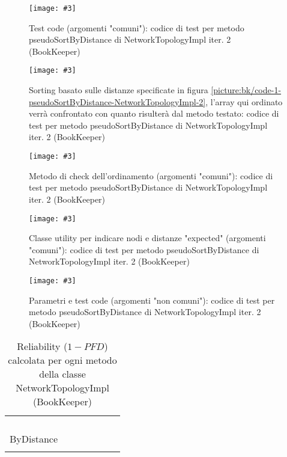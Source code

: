 \documentclass[10pt, a4paper]{article}
\newcommand{\Intmaketable}[4]{
	\begin{longtable}{#3}
	#4
	\caption{#2}
	\label{#1}
	\end{longtable}
}
\newcommand{\Intreltable}[3]{
	\Intmaketable{#1}{#2}{|l|l|l|l|l|l|l|}{
	\hline
	\thead{Metodo} & \thead{\# test totali} & \thead{\# test pass.} & \thead{\# test fail.} & \thead{Rif. num. tab. prof. op.} &
	\thead{Distribuzione} & \thead{Reliability}\\
	\hline
	\hline
	#3
	\hline}
}
\newcommand{\Intrelcaption}[2]{Reliability ($1-PFD$) calcolata per ogni metodo della classe #1 (#2)}
\newcommand{\gettablelabel}[5]{table:#1:#2:#3:iter#4:proj#5}
\newcommand{\getreltablelabel}[2]{\gettablelabel{#1}{}{}{}{#2}}
\newcommand{\reltable}[3] {
	\Intreltable{\getreltablelabel{#1}{#2}}
		{\Intrelcaption{#1}{#2}}
		{#3}
}
\newcommand{\unifdist}[1]{Uniforme: $#1$}
\newcommand{\getpicturelabel}[1]{picture:#1}
\newcommand{\makepicture}[4]{
	\begin{figure}[H]
	\centering
	\texttt{[image: \#3]}
	\caption{#4}
	\label{\getpicturelabel{#3}}
	\end{figure}
}
\newcommand{\finishcodecaption}[4]{codice di test per metodo #1 di #2 iter. #3 (#4)}
\newcommand{\tcell}{\makecell[tl]}
\newcommand{\newtrow}{\\ \hline}
\def\bookkeeper{BookKeeper}
\begin{document}
	\makepicture{17cm}{7.5cm}{bk/code-2-pseudoSortByDistance-NetworkTopologyImpl-2}
				{Test code (argomenti "comuni"): 
				\finishcodecaption{pseudoSortByDistance}{NetworkTopologyImpl}{2}{\bookkeeper}}
				
	\makepicture{17cm}{5cm}{bk/code-6-pseudoSortByDistance-NetworkTopologyImpl-2}
				{Sorting basato sulle distanze specificate in figura 
				\ref{\getpicturelabel{bk/code-1-pseudoSortByDistance-NetworkTopologyImpl-2}}, 
				l'array qui ordinato verrà confrontato con quanto risulterà dal metodo testato: 
				\finishcodecaption{pseudoSortByDistance}{NetworkTopologyImpl}{2}{\bookkeeper}}
				
	\makepicture{17cm}{16cm}{bk/code-3-pseudoSortByDistance-NetworkTopologyImpl-2}
				{Metodo di check dell'ordinamento (argomenti "comuni"): 
				\finishcodecaption{pseudoSortByDistance}{NetworkTopologyImpl}{2}{\bookkeeper}}
	
	\makepicture{10cm}{7cm}{bk/code-4-pseudoSortByDistance-NetworkTopologyImpl-2}
				{Classe utility per indicare nodi e distanze "expected" (argomenti "comuni"): 
				\finishcodecaption{pseudoSortByDistance}{NetworkTopologyImpl}{2}{\bookkeeper}}
				
	\makepicture{17cm}{12cm}{bk/code-5-pseudoSortByDistance-NetworkTopologyImpl-2}
				{Parametri e test code (argomenti "non comuni"): 
				\finishcodecaption{pseudoSortByDistance}{NetworkTopologyImpl}{2}{\bookkeeper}}
			
	\newpage
	\reltable{NetworkTopologyImpl}{\bookkeeper}{
			\tcell{add} &
			\tcell{$14$} &
			\tcell{$14$} &
			\tcell{$0$} &
			\tcell{
					tabella $\ref{\gettablelabel{testc}{add}{NetworkTopologyImpl}{1}{\bookkeeper}}$,
					tabella $\ref{\gettablelabel{testc}{add}{NetworkTopologyImpl}{2}{\bookkeeper}}$} &
			\tcell{\unifdist{0.07}} &
			\tcell{$1$}
		\newtrow	
			\tcell{remove} &
			\tcell{$3$} &
			\tcell{$3$} &
			\tcell{$0$} &
			\tcell{
					tabella $\ref{\gettablelabel{testc}{remove}{NetworkTopologyImpl}{1}{\bookkeeper}}$} &
			\tcell{\unifdist{0.33}} &
			\tcell{$1$}
		\newtrow
			\tcell{getDistance} &
			\tcell{$15$} &
			\tcell{$8$} &
			\tcell{$7$} &
			\tcell{
					tabella $\ref{\gettablelabel{testc}{getDistance}{NetworkTopologyImpl}{2}{\bookkeeper}}$} &
			\tcell{\unifdist{0.067}} &
			\tcell{$0.531$}
		\newtrow
			\tcell{pseudoSort\\ByDistance} &
			\tcell{$12$} &
			\tcell{$10$} &
			\tcell{$2$} &
			\tcell{
					tabella $\ref{\gettablelabel{testc}{pseudoSortByDistance}{NetworkTopologyImpl}{2}{\bookkeeper}}$} &
			\tcell{\unifdist{0.083}} &
			\tcell{$0.834$}
		\newtrow
	}
	
\end{document}
